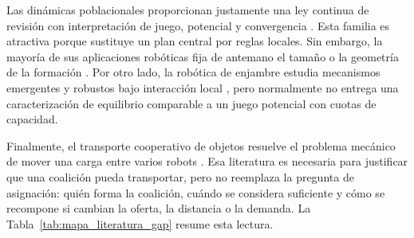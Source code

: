 Las dinámicas poblacionales proporcionan justamente una ley continua de revisión con
interpretación de juego, potencial y convergencia \citep{sandholm2010population,
quijano2017population,barreiro2017distributed,martinezpiazuelo2022tcss}. Esta familia es
atractiva porque sustituye un plan central por reglas locales. Sin embargo, la mayoría de
sus aplicaciones robóticas fija de antemano el tamaño o la geometría de la formación
\citep{martinez2020formation,barreiro2021uav,dinh2026bsplines}. Por otro lado, la
robótica de enjambre estudia mecanismos emergentes y robustos bajo interacción local
\citep{brambilla2013swarm,dorigo2021swarm,theraulaz1999stigmergy}, pero normalmente no
entrega una caracterización de equilibrio comparable a un juego potencial con cuotas de
capacidad.

Finalmente, el transporte cooperativo de objetos resuelve el problema mecánico de mover
una carga entre varios robots \citep{an2023cooperative,ebel2024cooperative,
rosenfelder2024force}. Esa literatura es necesaria para justificar que una coalición
pueda transportar, pero no reemplaza la pregunta de asignación: quién forma la coalición,
cuándo se considera suficiente y cómo se recompone si cambian la oferta, la distancia o
la demanda. La Tabla~\ref{tab:mapa_literatura_gap} resume esta lectura.

